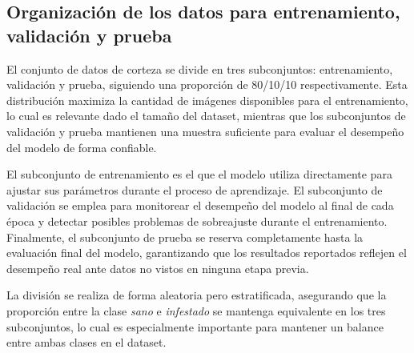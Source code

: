 \subsection{Organización de los datos para entrenamiento, validación y prueba}

El conjunto de datos de corteza se divide en tres subconjuntos: entrenamiento, validación y prueba, siguiendo una proporción de 80/10/10 respectivamente. Esta distribución maximiza la cantidad de imágenes disponibles para el entrenamiento, lo cual es relevante dado el tamaño del dataset, mientras que los subconjuntos de validación y prueba mantienen una muestra suficiente para evaluar el desempeño del modelo de forma confiable.

El subconjunto de entrenamiento es el que el modelo utiliza directamente para ajustar sus parámetros durante el proceso de aprendizaje. El subconjunto de validación se emplea para monitorear el desempeño del modelo al final de cada época y detectar posibles problemas de sobreajuste durante el entrenamiento. 
Finalmente, el subconjunto de prueba se reserva completamente hasta la evaluación final del modelo, garantizando que los resultados reportados reflejen el desempeño real ante datos no vistos en ninguna etapa previa.

La división se realiza de forma aleatoria pero estratificada, asegurando que la proporción entre la clase \textit{sano} e \textit{infestado} se mantenga equivalente en los tres subconjuntos, lo cual es especialmente importante para mantener un balance entre ambas clases en el dataset.